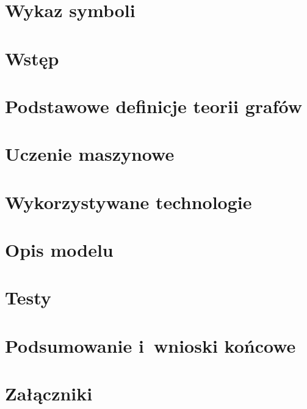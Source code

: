 \documentclass[12pt,a4paper]{report}
\begin{document}
\maketitle

\blankpage

\tableofcontents
\clearpage

\blankpage

\chapter*{Wykaz symboli}

\clearpage

\chapter*{Wstęp}

\clearpage

\chapter{Podstawowe definicje teorii grafów}

\clearpage

\chapter{Uczenie maszynowe}

\clearpage

\chapter{Wykorzystywane technologie}

\clearpage

\chapter{Opis modelu}

\clearpage

\chapter{Testy}

\clearpage

\chapter*{Podsumowanie i~wnioski końcowe}

\clearpage


\clearpage

\chapter*{Załączniki}

\clearpage


\end{document}
